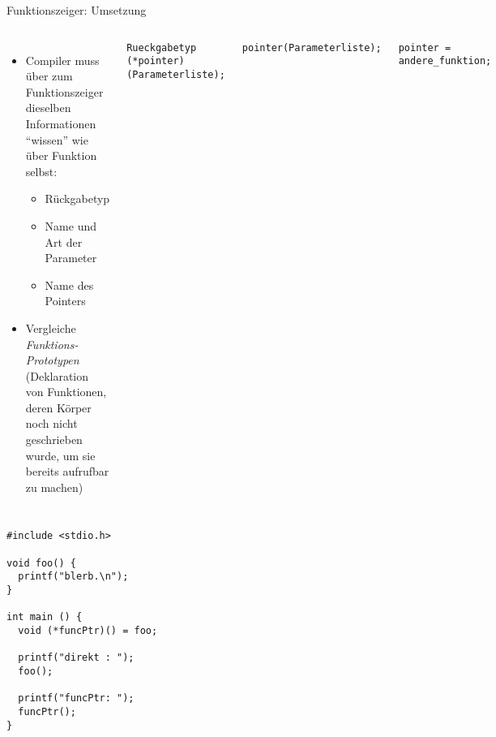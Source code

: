 \begin{frame}[fragile]{Funktionszeiger: Umsetzung}
%
\begin{columns}[T]
\begin{itemize}
\item Compiler muss über zum Funktionszeiger dieselben Informationen \enquote{wissen} wie über Funktion selbst:
	\begin{itemize}
	\item Rückgabetyp
	\item Name und Art der Parameter
	\item Name des Pointers
	\end{itemize}
\item Vergleiche \emph{Funktions-Prototypen} (Deklaration von Funktionen, deren Körper noch nicht geschrieben wurde, um sie bereits aufrufbar zu machen)
\end{itemize}
%
\begin{codebox}
\begin{verbatim}
Rueckgabetyp (*pointer) (Parameterliste);
\end{verbatim}
\end{codebox}
%
\begin{codebox}
\begin{verbatim}
pointer(Parameterliste);
\end{verbatim}
\end{codebox}
%
\begin{codebox}
\begin{verbatim}
pointer = andere_funktion;
\end{verbatim}
\end{codebox}
\end{columns}

%
\end{frame}


\begin{frame}[fragile]
%
\begin{codebox}
\begin{verbatim}
#include <stdio.h>

void foo() {
  printf("blerb.\n");
}

int main () {
  void (*funcPtr)() = foo;
  
  printf("direkt : ");
  foo();
  
  printf("funcPtr: ");
  funcPtr();
}
\end{verbatim}
\end{codebox}
%
\end{frame}


